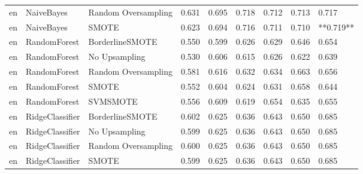 \begin{tabular}{lllllllll}
      en &                   NaiveBayes & Random Oversampling & 0.631 &                     0.695 &                 0.718 &                  0.712 &                                   0.713 &     0.717 \\
      en &                   NaiveBayes &               SMOTE & 0.623 &                     0.694 &                 0.716 &                  0.711 &                                   0.710 & **0.719** \\
      en &                 RandomForest &     BorderlineSMOTE & 0.550 &                     0.599 &                 0.626 &                  0.629 &                                   0.646 &     0.654 \\
      en &                 RandomForest &       No Upsampling & 0.530 &                     0.606 &                 0.615 &                  0.626 &                                   0.622 &     0.639 \\
      en &                 RandomForest & Random Oversampling & 0.581 &                     0.616 &                 0.632 &                  0.634 &                                   0.663 &     0.656 \\
      en &                 RandomForest &               SMOTE & 0.552 &                     0.604 &                 0.624 &                  0.631 &                                   0.658 &     0.644 \\
      en &                 RandomForest &            SVMSMOTE & 0.556 &                     0.609 &                 0.619 &                  0.654 &                                   0.635 &     0.655 \\
      en &              RidgeClassifier &     BorderlineSMOTE & 0.602 &                     0.625 &                 0.636 &                  0.643 &                                   0.650 &     0.685 \\
      en &              RidgeClassifier &       No Upsampling & 0.599 &                     0.625 &                 0.636 &                  0.643 &                                   0.650 &     0.685 \\
      en &              RidgeClassifier & Random Oversampling & 0.600 &                     0.625 &                 0.636 &                  0.643 &                                   0.650 &     0.685 \\
      en &              RidgeClassifier &               SMOTE & 0.599 &                     0.625 &                 0.636 &                  0.643 &                                   0.650 &     0.685 \\

\end{tabular}
